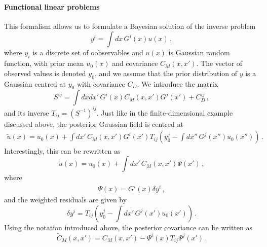 \paragraph{Functional linear problems} This formalism allows us to formulate a Bayesian solution of the inverse problem 
\begin{equation}
  \label{eq:BayesLinearInverse}
  y^i = \int dx\, G^i(x) u(x)\, ,
\end{equation}
where $y_i$ is a discrete set of oobservables and $u(x)$ is Gaussian random
function, with prior mean $u_0(x)$ and covariance $C_M(x,x')$. The vector of
observed values is denoted $y_0$, and we assume that the prior distribution of
$y$ is a Gaussian centred at $y_0$ with covariance $C_D$. We introduce the
matrix
\begin{equation}
  \label{eq:Smatrix}
  S^{ij} =
  \int dx dx'\, G^i(x) C_M(x,x') G^j(x') + C_D^{ij}\, ,
\end{equation}
and its inverse $T_{ij}=\left(S^{-1}\right)^{ij}$. Just like in the finite-dimensional example discussed above, the posterior Gaussian field is centred at
\begin{align}
  \label{eq:PostMeanFunc}
  \tilde{u}(x) = u_0(x) + 
  \int dx'\, C_M(x,x') G^i(x') T_{ij} \left(
    y_0^j - \int dx''\, G^j(x'') u_0(x'') 
  \right)\, .
\end{align}
Interestingly, this can be rewritten as
\begin{equation}
  \label{eq:TowardsBackus}
  \tilde{u}(x) = u_0(x) + 
  \int dx'\, C_M(x,x') \Psi(x')\, ,
\end{equation}
where 
\begin{eqnarray}
  \label{eq:PsiDef}
  \Psi(x) = G^i(x) \delta y^i\, ,
\end{eqnarray}
and the weighted residuals are given by
\begin{equation}
  \label{eq:DeltaYDef}
  \delta y^i = T_{ij} \left(
  y_0^j - \int dx'\, G^j(x') u_0(x')
  \right)\, .
\end{equation}
Using the notation introduced above, the posterior covariance can be written as
\begin{equation}
  \label{eq:PostCovFunc}
  \tilde{C}_M(x,x') = 
  C_M(x,x') - \Psi^i(x) T_{ij} \Psi^j(x')\, .
\end{equation}

